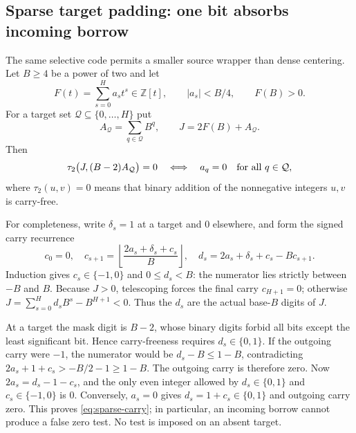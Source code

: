 \subsection{Sparse target padding: one bit absorbs incoming borrow}
The same selective code permits a smaller source wrapper than dense
centering.  Let $B\geq4$ be a power of two and let
\[
 F(t)=\sum_{s=0}^H a_st^s\in\mathbb Z[t],\qquad
 |a_s|<B/4,\qquad F(B)>0.
\]
For a target set $\mathcal Q\subseteq\{0,\ldots,H\}$ put
\[
 A_{\mathcal Q}=\sum_{q\in\mathcal Q}B^q,\qquad
 J=2F(B)+A_{\mathcal Q}.
\]
Then
\begin{equation}
 \tau_2\bigl(J,(B-2)A_{\mathcal Q}\bigr)=0
 \quad\Longleftrightarrow\quad
 a_q=0\quad\hbox{for all }q\in\mathcal Q,\label{eq:sparse-carry}
\end{equation}
where $\tau_2(u,v)=0$ means that binary addition of the nonnegative
integers $u,v$ is carry-free.

For completeness, write $\delta_s=1$ at a target and 0 elsewhere, and
form the signed carry recurrence
\[
 c_0=0,\quad
 c_{s+1}=\left\lfloor\frac{2a_s+\delta_s+c_s}{B}\right\rfloor,
 \quad d_s=2a_s+\delta_s+c_s-Bc_{s+1}.
\]
Induction gives $c_s\in\{-1,0\}$ and $0\leq d_s<B$: the numerator
lies strictly between $-B$ and $B$.  Because $J>0$, telescoping forces
the final carry $c_{H+1}=0$; otherwise
$J=\sum_{s=0}^H d_sB^s-B^{H+1}<0$.  Thus the $d_s$ are the actual
base-$B$ digits of $J$.

At a target the mask digit is $B-2$, whose binary digits forbid all bits
except the least significant bit.  Hence carry-freeness requires
$d_s\in\{0,1\}$.  If the outgoing carry were $-1$, the numerator would
be $d_s-B\leq1-B$, contradicting
$2a_s+1+c_s>-B/2-1\geq1-B$.  The outgoing carry is therefore zero.
Now $2a_s=d_s-1-c_s$, and the only even integer allowed by
$d_s\in\{0,1\}$ and $c_s\in\{-1,0\}$ is 0.  Conversely, $a_s=0$
gives $d_s=1+c_s\in\{0,1\}$ and outgoing carry zero.  This proves
\eqref{eq:sparse-carry}; in particular, an incoming borrow cannot produce
a false zero test.  No test is imposed on an absent target.


